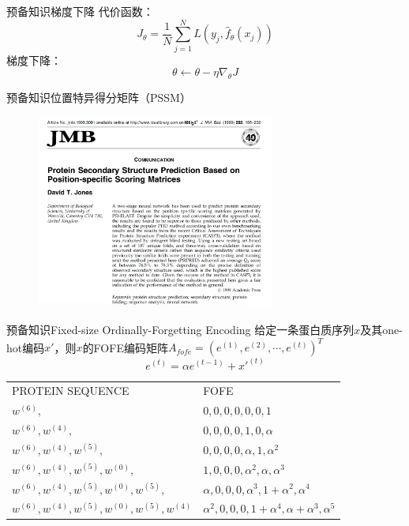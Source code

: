 \documentclass[table]{beamer}
\begin{document}
\begin{frame}{预备知识}{梯度下降}
代价函数：
\begin{equation}
	J_{\theta}=\frac{1}{N}\sum_{j=1}^{N}L(y_j, \hat{f}_{\theta}(x_j))	
\end{equation}
梯度下降：
\begin{equation}
	\theta \gets \theta - \eta \nabla_{\theta} J
\end{equation}
\end{frame}

\begin{frame}{预备知识}{位置特异得分矩阵（PSSM）}
	\begin{figure}
		\centering
		\includegraphics[width=0.7\textwidth]{pic/pptpssm}
	\end{figure}
\end{frame}

\begin{frame}{预备知识}{Fixed-size Ordinally-Forgetting Encoding}
给定一条蛋白质序列$x$及其one-hot编码$x'$，则$x$的FOFE编码矩阵$A_{fofe}=(e^{(1)},e^{(2)},\cdots,e^{(t)})^T$
\begin{equation}
	e^{(t)} = \alpha e^{(t-1)}+x'^{(t)}	
\end{equation}

\begin{table}
\begin{tabular}{l|l}
\rowcolor{blue!70}PROTEIN SEQUENCE & FOFE\\
$w^{(6)},$ & $0,0,0,0,0,0,1$ \\
$w^{(6)},w^{(4)},$ & $0,0,0,0,1,0,\alpha$ \\
$w^{(6)},w^{(4)},w^{(5)},$ & $0,0,0,0,\alpha,1,{\alpha}^2$ \\
$w^{(6)},w^{(4)},w^{(5)},w^{(0)},$ & $1,0,0,0,{\alpha}^2,\alpha,{\alpha}^3$ \\
$w^{(6)},w^{(4)},w^{(5)},w^{(0)},w^{(5)},$ & $\alpha,0,0,0,{\alpha}^3,1+{\alpha}^2,{\alpha}^4$  \\
$w^{(6)},w^{(4)},w^{(5)},w^{(0)},w^{(5)},w^{(4)}$ & ${\alpha}^2,0,0,0,1+{\alpha}^4,{\alpha}+{\alpha}^3,{\alpha}^5$ \\
\end{tabular}
\end{table}

\end{frame}
\end{document}
